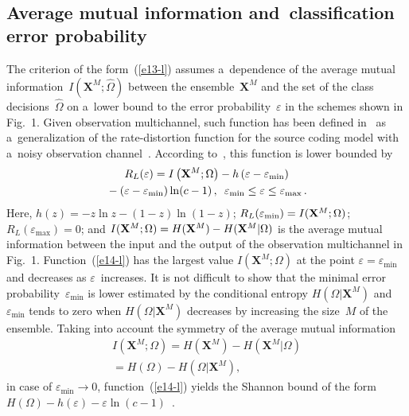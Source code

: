 \begin{multicols}{2}
\begin{figure*} %
 \vspace*{1pt}
    \begin{center}  
  \mbox{%
 \epsfxsize=154.826mm 
 }
\end{center}
\vspace*{-9pt}
\end{figure*}  


\subsection{Average mutual information and~classification error probability}

\noindent
The criterion of the form~(\ref{e13-l}) assumes a~dependence of the average mutual 
information~$I(\mathbf{X}^M;\hat{\Omega})$ between the 
ensemble~$\mathbf{X}^M$ and the set of the class decisions~$\hat{\Omega}$ on 
a~lower bound to the error probability~$\varepsilon$ in the schemes shown in 
Fig.~1. Given observation multichannel, such function has been defined 
in~\cite{8-l} as a~generalization of the rate-distortion function for the source 
coding model with a~noisy observation channel~\cite{9-l}.  According  
to~\cite{8-l}, this function is lower bounded by 
\begin{multline}
R_L(\varepsilon) =I\left(\mathbf{X}^M;\Omega\right) -h\left(\varepsilon-
\varepsilon_{\min} \right)\\
{} -\left( \varepsilon -\varepsilon_{\min} \right) \ln (c-
1)\,,\enskip \varepsilon_{\min}\leq \varepsilon \leq \varepsilon_{\max}\,.
\label{e14-l}
\end{multline}
Here, $h(z) = -z\ln z -(1-z) \ln (1-z)$; 
$R_L(\varepsilon_{\min})\linebreak =I(\mathbf{X}^M;\Omega)$; 
$R_L(\varepsilon_{\max})= 0$; and $I(\mathbf{X}^M;\Omega) 
=H(\mathbf{X}^M)\linebreak - H(\mathbf{X}^M\vert\Omega)$ is the average mutual 
information between the input and the output of the observation multichannel in 
Fig.~1. Function~(\ref{e14-l}) has the largest value 
$I(\mathbf{X}^M;\Omega)$ at the point $\varepsilon=\varepsilon_{\min}$ and 
decreases as $\varepsilon$~increases. It is not difficult to show that the minimal error 
probability~$\varepsilon_{\min}$ is lower estimated by the conditional entropy 
$H(\Omega\vert \mathbf{X}^M)$ and~$\varepsilon_{\min}$ tends to zero 
when $H(\Omega\vert \mathbf{X}^M)$  decreases by increasing the size~$M$ of 
the ensemble. Taking into account the symmetry of the average mutual information 
\begin{multline*}
I(\mathbf{X}^M;\Omega)=H(\mathbf{X}^M)-H(\mathbf{X}^M\vert\Omega)\\
{}= 
H(\Omega)-H(\Omega\vert \mathbf{X}^M),
\end{multline*}
 in case of $\varepsilon_{\min}\to0$,  
function~(\ref{e14-l}) yields the Shannon bound of the form  
$H(\Omega)-h(\varepsilon) -\varepsilon\ln (c-1)$~\cite{7-l}. 


\end{multicols}

